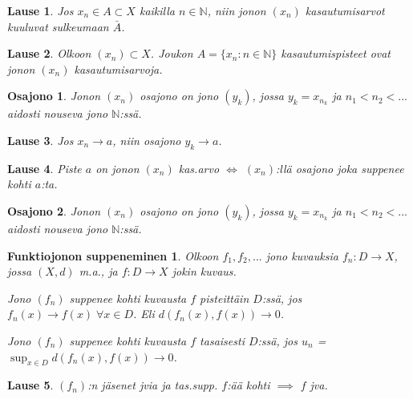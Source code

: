 \documentclass[landscape,a4paper,10pt]{article}
\theoremstyle{customtheoremstyle}
\newtheorem*{theorem}{Lause}
\begin{document}
\begin{multicols*}{3}
\begin{theorem}
  Jos $x_n \in A \subset X$ kaikilla $n \in \mathbb{N}$, niin jonon $(x_n)$
  kasautumisarvot kuuluvat sulkeumaan $\bar{A}$.
\end{theorem}

\begin{theorem}
  Olkoon $(x_n) \subset X$. Joukon $A = \{x_n : n \in \mathbb{N} \}$
  kasautumispisteet ovat jonon $(x_n)$ kasautumisarvoja.
\end{theorem}

\newtheorem*{defn:osajono}{Osajono}
\begin{defn:osajono}
  Jonon $(x_n)$ osajono on jono $(y_k)$, jossa $y_k = x_{n_k}$ ja $n_1 < n_2 <
  ...$ aidosti nouseva jono $\mathbb{N}$:ssä.
\end{defn:osajono}

\begin{theorem}
  Jos $x_n \rightarrow a$, niin osajono $y_k \rightarrow a$.
\end{theorem}

\begin{theorem}
  Piste $a$ on jonon $(x_n)$ kas.arvo $\iff$ $(x_n)$:llä osajono joka suppenee
  kohti $a$:ta.
\end{theorem}

\newtheorem*{defn:}{Osajono}
\begin{defn:osajono}
  Jonon $(x_n)$ osajono on jono $(y_k)$, jossa $y_k = x_{n_k}$ ja $n_1 < n_2 <
  ...$ aidosti nouseva jono $\mathbb{N}$:ssä.
\end{defn:osajono}

\newtheorem*{defn:funktiojono}{Funktiojonon suppeneminen}
\begin{defn:funktiojono}
  Olkoon $f_1, f_2, ...$ jono kuvauksia $f_n : D \rightarrow X$, jossa $(X,d)$
  m.a., ja $f: D \rightarrow X$ jokin kuvaus.

  Jono $(f_n)$ suppenee kohti kuvausta $f$ \emph{pisteittäin}
  $D$:ssä, jos $f_n(x) \rightarrow f(x) \; \forall x \in D$. Eli
  $d(f_n(x), f(x)) \rightarrow 0$.

  Jono $(f_n)$ suppenee kohti kuvausta $f$ \emph{tasaisesti} $D$:ssä, jos
  $u_n$ = $\sup_{x \in D} d(f_n(x), f(x)) \rightarrow 0 $.
\end{defn:funktiojono}

\begin{theorem}
  $(f_n)$:n jäsenet jvia ja tas.supp. $f$:ää kohti $\implies$ $f$ jva.
\end{theorem}


\end{multicols*}
\end{document}

